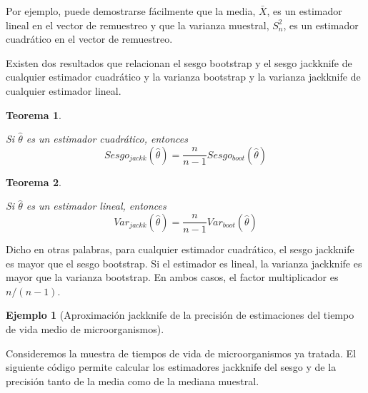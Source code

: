 \documentclass[
]{book}
\theoremstyle{break}
\newtheorem{theorem}{Teorema}[chapter]
\theoremstyle{definition}
\theoremstyle{definition}
\newtheorem{example}{Ejemplo}[chapter]
\theoremstyle{definition}
\theoremstyle{definition}
\theoremstyle{remark}
\begin{document}
Por ejemplo, puede demostrarse fácilmente que la media, \(\bar{X}\),
es un estimador lineal en el vector de remuestreo y que la varianza
muestral, \(S_n^2\), es un estimador cuadrático en el vector de
remuestreo.

Existen dos resultados que relacionan el sesgo bootstrap y el sesgo
jackknife de cualquier estimador cuadrático y la varianza bootstrap y la
varianza jackknife de cualquier estimador lineal.

\begin{theorem}
\protect\hypertarget{thm:jack-boot-sesgo}{}{\label{thm:jack-boot-sesgo} } \vspace{0.5cm}

Si \(\hat{\theta}\) es un estimador cuadrático, entonces
\[Sesgo_{jackk}\left( \hat{\theta} \right) =\frac{n}{n-1}Sesgo_{boot}\left( 
\hat{\theta} \right)\]
\end{theorem}

\begin{theorem}
\protect\hypertarget{thm:jack-boot-precision}{}{\label{thm:jack-boot-precision} } \vspace{0.5cm}

Si \(\hat{\theta}\) es un estimador lineal, entonces
\[Var_{jackk}\left( \hat{\theta} \right) =\frac{n}{n-1}Var_{boot}\left( \hat{
\theta} \right)\]
\end{theorem}

Dicho en otras palabras, para cualquier estimador cuadrático, el sesgo
jackknife es mayor que el sesgo bootstrap. Si el estimador es lineal, la
varianza jackknife es mayor que la varianza bootstrap. En ambos casos,
el factor multiplicador es \(n/(n-1)\).

\begin{example}[Aproximación jackknife de la precisión de estimaciones del tiempo de vida medio de microorganismos]
\protect\hypertarget{exm:estimacion-jack-precision}{}{\label{exm:estimacion-jack-precision} \iffalse (Aproximación jackknife de la precisión de estimaciones del tiempo de vida medio de microorganismos) \fi{} } \vspace{0.5cm}

Consideremos la muestra de tiempos de vida de microorganismos ya
tratada. El siguiente código permite calcular los
estimadores jackknife del sesgo y de la precisión tanto de la media como
de la mediana muestral.
\end{example}
\end{document}
